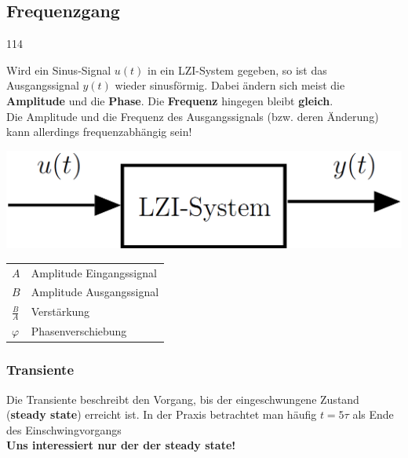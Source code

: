 \subsection{Frequenzgang}{114}      %

Wird ein Sinus-Signal $u(t)$ in ein LZI-System gegeben, so ist das Ausgangssignal $y(t)$ wieder sinusförmig.
Dabei ändern sich meist die \textbf{Amplitude} und die \textbf{Phase}.
Die \textbf{Frequenz} hingegen bleibt \textbf{gleich}.\\
Die Amplitude und die Frequenz des Ausgangssignals (bzw. deren Änderung) kann allerdings frequenzabhängig sein!

\begin{minipage}[c]{0.48\columnwidth}
    \includegraphics[width=\columnwidth]{images/lzi_system.png}
\end{minipage}
\hfill
\begin{minipage}[c]{0.48\columnwidth}
    \begin{tabular}{ll}
        $A$             & Amplitude Eingangssignal \\
        $B$             & Amplitude Ausgangssignal \\
        $\frac{B}{A}$   & Verstärkung \\
        $\varphi$       & Phasenverschiebung \\
    \end{tabular}
\end{minipage}


\subsubsection{Transiente}

 Die Transiente beschreibt den Vorgang, bis der eingeschwungene Zustand (\textbf{steady state}) erreicht ist.
 In der Praxis betrachtet man häufig $t = 5 \tau$ als Ende des Einschwingvorgangs \\
 \textrightarrow \textbf{Uns interessiert nur der der steady state!}


